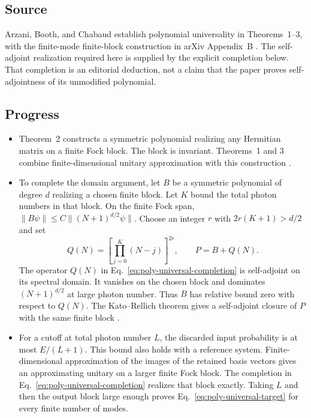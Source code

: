 \subsection*{Source}

Arzani, Booth, and Chabaud establish polynomial universality in Theorems~1--3, with the finite-mode finite-block construction in arXiv Appendix~B .
The self-adjoint realization required here is supplied by the explicit completion below.
That completion is an editorial deduction, not a claim that the paper proves self-adjointness of its unmodified polynomial.

\subsection*{Progress}

\begin{itemize}
  \item Theorem~2 constructs a symmetric polynomial realizing any Hermitian matrix on a finite Fock block.
The block is invariant.
Theorems~1 and 3 combine finite-dimensional unitary approximation with this construction .

  \item To complete the domain argument, let $B$ be a symmetric polynomial of degree $d$ realizing a chosen finite block.
Let $K$ bound the total photon numbers in that block.
On the finite Fock span,
$\|B\psi\|\leq C\|(N+1)^{d/2}\psi\|$.
Choose an integer $r$ with $2r(K+1)>d/2$ and set
\begin{equation}
 Q(N)=\left[\prod_{j=0}^{K}(N-j)\right]^{2r},
 \qquad P=B+Q(N).
 \label{eq:poly-universal-completion}
\end{equation}
The operator $Q(N)$ in Eq.~\eqref{eq:poly-universal-completion} is self-adjoint on its spectral domain.
It vanishes on the chosen block and dominates $(N+1)^{d/2}$ at large photon number.
Thus $B$ has relative bound zero with respect to $Q(N)$.
The Kato--Rellich theorem gives a self-adjoint closure of $P$ with the same finite block .

  \item For a cutoff at total photon number $L$, the discarded input probability is at most $E/(L+1)$.
This bound also holds with a reference system.
Finite-dimensional approximation of the images of the retained basis vectors gives an approximating unitary on a larger finite Fock block.
The completion in Eq.~\eqref{eq:poly-universal-completion} realizes that block exactly.
Taking $L$ and then the output block large enough proves Eq.~\eqref{eq:poly-universal-target} for every finite number of modes.
\end{itemize}

